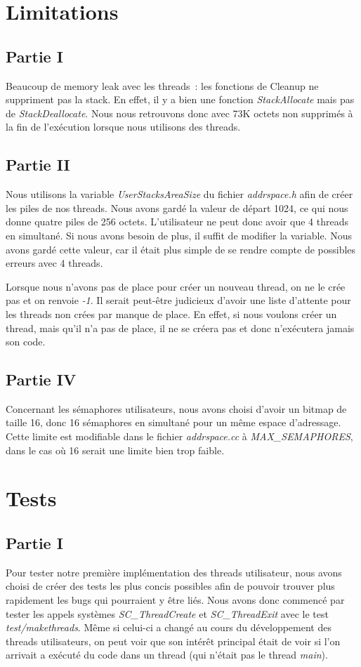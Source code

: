 \documentclass{article}
\begin{document}
\section{Limitations}
\subsection{Partie I}
Beaucoup de memory leak avec les threads : les fonctions de Cleanup ne
suppriment pas la stack. En effet, il y a bien une fonction
\textit{StackAllocate} mais pas de \textit{StackDeallocate}. Nous nous
retrouvons donc avec 73K octets non supprimés à la fin de l'exécution lorsque
nous utilisons des threads.

\subsection{Partie II}
Nous utilisons la variable \textit{UserStacksAreaSize} du fichier
\textit{addrspace.h} afin de créer les piles de nos threads. Nous avons gardé
la valeur de départ 1024, ce qui nous donne quatre piles de 256 octets.
L'utilisateur ne peut donc avoir que 4 threads en simultané. Si nous avons
besoin de plus, il suffit de modifier la variable. Nous avons gardé cette
valeur, car il était plus simple de se rendre compte de possibles erreurs avec
4 threads.

Lorsque nous n'avons pas de place pour créer un nouveau thread, on ne le crée pas et on renvoie
\textit{-1}. Il serait peut-être judicieux d'avoir une liste d'attente pour les threads non 
crées par manque de place. En effet, si nous voulons créer un thread, mais qu'il n'a pas de place,
il ne se créera pas et donc n'exécutera jamais son code.

\subsection{Partie IV}
Concernant les sémaphores utilisateurs, nous avons choisi d'avoir un bitmap de
taille 16, donc 16 sémaphores en simultané pour un même espace d'adressage.
Cette limite est modifiable dans le fichier \textit{addrspace.cc} à
\textit{MAX\_SEMAPHORES}, dans le cas où 16 serait une limite bien trop faible.

\section{Tests}
\subsection{Partie I}
Pour tester notre première implémentation des threads utilisateur, nous avons choisi de créer des tests les plus concis possibles
afin de pouvoir trouver plus rapidement les bugs qui pourraient y être liés. Nous avons donc commencé par tester les appels systèmes
\textit{SC\_ThreadCreate} et \textit{SC\_ThreadExit} avec le test \textit{test/makethreads}. Même si celui-ci a changé au cours du 
développement des threads utilisateurs, on peut voir que son intérêt principal était de voir si l'on arrivait a exécuté du code dans
un thread (qui n'était pas le thread \textit{main}). 
\end{document}
